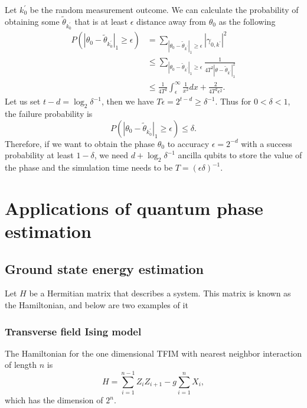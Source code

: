 \documentclass[11pt]{article}
\begin{document}
Let $k_0^{'}$ be the random measurement outcome. We can calculate the probability of obtaining some $\tilde{\theta}_{k_0^{'}}$ that is at least $\epsilon$ distance away from $\theta_0$ as the following 
\begin{align}
    P(|\theta_0 - \tilde{\theta}_{k_0^{'}}|_1 \geq \epsilon) &= \sum_{|\theta_0 - \tilde{\theta}_{k^{'}}|_1 \geq \epsilon} |\gamma_{0,k^{'}}|^2 \nonumber \\
    &\leq \sum_{|\theta_0 - \tilde{\theta}_{k^{'}}|_1 \geq \epsilon} \frac{1}{4T^2|\theta-\tilde{\theta}_{k^{'}}|_1^2} \nonumber \\
    &\leq \frac{1}{4T^2}\int_{\epsilon}^{\infty}\frac{1}{x^2}dx + \frac{2}{4T^2\epsilon^2}.
\end{align}
Let us set $t - d = \log_2\delta^{-1}$, then we have $T\epsilon = 2^{t-d}\geq \delta^{-1}$. Thus for $0<\delta<1$, the failure probability is 
\begin{equation}
    P(|\theta_0 - \tilde{\theta}_{k_0^{'}}|_1 \geq \epsilon) \leq \delta.
\end{equation} 
Therefore, if we want to obtain the phase $\theta_0$ to accuracy $\epsilon = 2^{-d}$ with a success probability at least $1-\delta$, we need $d + \log_2\delta^{-1}$ ancilla qubits to store the value of the phase and the simulation time needs to be $T = (\epsilon\delta)^{-1}$.

\section{Applications of quantum phase estimation}
\subsection{Ground state energy estimation}
Let $H$ be a Hermitian matrix that describes a system. This matrix is known as the Hamiltonian, and below are two examples of it
\subsubsection*{Transverse field Ising model}
The Hamiltonian for the one dimensional TFIM with nearest neighbor interaction of length $n$ is 
\begin{equation}
    H = \sum_{i=1}^{n-1}Z_iZ_{i+1} - g\sum_{i=1}^{n}X_i,
\end{equation}
which has the dimension of $2^n$.
\end{document}
